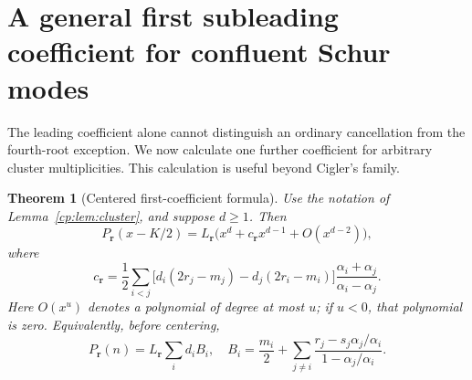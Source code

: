 \documentclass[11pt]{article}
\newtheorem{theorem}{Theorem}[section]
\theoremstyle{definition}
\theoremstyle{remark}
\theoremstyle{definition}
\theoremstyle{plain}
\numberwithin{equation}{section}
\begin{document}
\section{A general first subleading coefficient for confluent Schur modes}
\label{cp:sec:jet}
The leading coefficient alone cannot distinguish an ordinary cancellation
from the fourth-root exception. We now calculate one further coefficient
for arbitrary cluster multiplicities. This calculation is useful beyond
Cigler's family.

\begin{theorem}[Centered first-coefficient formula]
\label{cp:thm:jet}
Use the notation of Lemma~\ref{cp:lem:cluster}, and suppose $d\ge1$.
Then
\begin{equation}
 P_{\boldsymbol r}(x-K/2)=L_{\boldsymbol r}
 \bigl(x^d+c_{\boldsymbol r}x^{d-1}+O(x^{d-2})\bigr),
 \label{cp:eq:jet}
\end{equation}
where
\begin{equation}
 \boxed{\displaystyle
 c_{\boldsymbol r}=\frac12\sum_{i<j}
 \bigl[d_i(2r_j-m_j)-d_j(2r_i-m_i)\bigr]
 \frac{\alpha_i+\alpha_j}{\alpha_i-\alpha_j}.}
 \label{cp:eq:jetc}
\end{equation}
Here $O(x^u)$ denotes a polynomial of degree at most $u$; if $u<0$,
that polynomial is zero. Equivalently, before centering,
\begin{equation}
 [n^{d-1}]P_{\boldsymbol r}(n)=L_{\boldsymbol r}\sum_i d_i B_i,
 \quad
 B_i=\frac{m_i}{2}+
 \sum_{j\ne i}\frac{r_j-s_j\alpha_j/\alpha_i}{1-\alpha_j/\alpha_i}.
 \label{cp:eq:uncenteredjet}
\end{equation}
\end{theorem}
\end{document}
